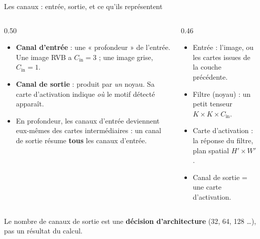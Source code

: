 \begin{frame}{Les canaux : entrée, sortie, et ce qu'ils représentent}
\begin{columns}[t]
\begin{column}{0.50\textwidth}
\begin{itemize}
  \item \textbf{Canal d'entrée} : une « profondeur » de l'entrée.
  Une image RVB a $C_{\text{in}} = 3$ ; une image grise, $C_{\text{in}} = 1$.
  \item \textbf{Canal de sortie} : produit par \emph{un} noyau. Sa carte
  d'activation indique \emph{où} le motif détecté apparaît.
  \item En profondeur, les canaux d'entrée deviennent eux-mêmes des cartes
  intermédiaires : un canal de sortie résume \textbf{tous} les canaux d'entrée.
\end{itemize}
\end{column}
\begin{column}{0.46\textwidth}
\begin{ebox}
\begin{itemize}
  \item Entrée : l'image, ou les cartes issues de la couche précédente.
  \item Filtre (noyau) : un petit tenseur $K \times K \times C_{\text{in}}$.
  \item Carte d'activation : la réponse du filtre, plan spatial
  $H' \times W'$.
  \item Canal de sortie = une carte d'activation.
\end{itemize}
\end{ebox}
\end{column}
\end{columns}
\vspace{1mm}
\begin{kbox}
Le nombre de canaux de sortie est une \textbf{décision d'architecture}
(32, 64, 128 \dots), pas un résultat du calcul.
\end{kbox}
\end{frame}

